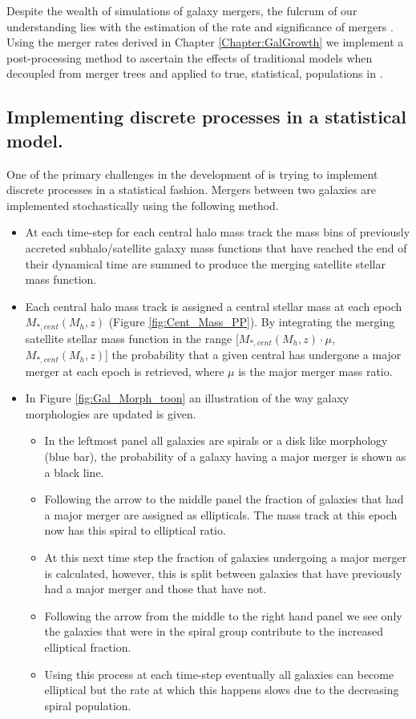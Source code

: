 Despite the wealth of simulations of galaxy mergers, the fulcrum of our understanding lies with the estimation of the rate and significance of mergers \cite{Hopkins2010MERGERSMATTER, Hopkins2010MergersRate}. Using the merger rates derived in Chapter \ref{Chapter:GalGrowth} we implement a post-processing method to ascertain the effects of traditional models when decoupled from merger trees and applied to true, statistical, populations in \steel.

\subsection{Implementing discrete processes in a statistical model.}

One of the primary challenges in the development of \steel is trying to implement discrete processes in a statistical fashion. Mergers between two galaxies are implemented stochastically using the following method.
\begin{itemize}
    \item At each time-step for each central halo mass track the mass bins of previously accreted subhalo/satellite galaxy mass functions that have reached the end of their dynamical time are summed to produce the merging satellite stellar mass function. 
    \item Each central halo mass track is assigned a central stellar mass at each epoch $M_{*,cent}(M_{h}, z)$ (Figure \ref{fig:Cent_Mass_PP}). By integrating the merging satellite stellar mass function in the range [$M_{*,cent}(M_{h}, z) \cdot \mu$, $M_{*,cent}(M_{h}, z)$] the probability that a given central has undergone a major merger at each epoch is retrieved, where $\mu$ is the major merger mass ratio. 
    \item In Figure \ref{fig:Gal_Morph_toon} an illustration of the way galaxy morphologies are updated is given. 
    \begin{itemize}
        \item In the leftmost panel all galaxies are spirals or a disk like morphology (blue bar), the probability of a galaxy having a major merger is shown as a black line.
        \item Following the arrow to the middle panel the fraction of galaxies that had a major merger are assigned as ellipticals. The mass track at this epoch now has this spiral to elliptical ratio.
        \item At this next time step the fraction of galaxies undergoing a major merger is calculated, however, this is split between galaxies that have previously had a major merger and those that have not. 
        \item Following the arrow from the middle to the right hand panel we see only the galaxies that were in the spiral group contribute to the increased elliptical fraction.
        \item Using this process at each time-step eventually all galaxies can become elliptical but the rate at which this happens slows due to the decreasing spiral population.
    \end{itemize}
\end{itemize}

